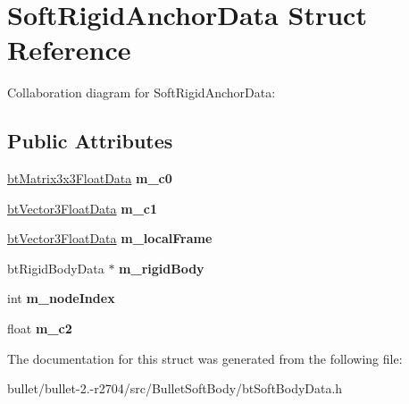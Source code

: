 \hypertarget{struct_soft_rigid_anchor_data}{\section{Soft\+Rigid\+Anchor\+Data Struct Reference}
\label{struct_soft_rigid_anchor_data}
}


Collaboration diagram for Soft\+Rigid\+Anchor\+Data\+:
\subsection*{Public Attributes}
\begin{DoxyCompactItemize}
\item 
\hypertarget{struct_soft_rigid_anchor_data_a0a22d1db38d705aeed26b269ea626fd4}{\hyperlink{structbt_matrix3x3_float_data}{bt\+Matrix3x3\+Float\+Data} {\bfseries m\+\_\+c0}}\label{struct_soft_rigid_anchor_data_a0a22d1db38d705aeed26b269ea626fd4}

\item 
\hypertarget{struct_soft_rigid_anchor_data_a83c966bd2a61bb9b6324bc66ba6425aa}{\hyperlink{structbt_vector3_float_data}{bt\+Vector3\+Float\+Data} {\bfseries m\+\_\+c1}}\label{struct_soft_rigid_anchor_data_a83c966bd2a61bb9b6324bc66ba6425aa}

\item 
\hypertarget{struct_soft_rigid_anchor_data_a1c9b5b7de7eae0bcefcc06241ea10b04}{\hyperlink{structbt_vector3_float_data}{bt\+Vector3\+Float\+Data} {\bfseries m\+\_\+local\+Frame}}\label{struct_soft_rigid_anchor_data_a1c9b5b7de7eae0bcefcc06241ea10b04}

\item 
\hypertarget{struct_soft_rigid_anchor_data_a893c8e4bd76a06d9312439d615ca9676}{bt\+Rigid\+Body\+Data $\ast$ {\bfseries m\+\_\+rigid\+Body}}\label{struct_soft_rigid_anchor_data_a893c8e4bd76a06d9312439d615ca9676}

\item 
\hypertarget{struct_soft_rigid_anchor_data_aff037297a50a284782d25b7b9e07128e}{int {\bfseries m\+\_\+node\+Index}}\label{struct_soft_rigid_anchor_data_aff037297a50a284782d25b7b9e07128e}

\item 
\hypertarget{struct_soft_rigid_anchor_data_ac04b4388734aef9e6aca362fc6a686e2}{float {\bfseries m\+\_\+c2}}\label{struct_soft_rigid_anchor_data_ac04b4388734aef9e6aca362fc6a686e2}

\end{DoxyCompactItemize}


The documentation for this struct was generated from the following file\+:\begin{DoxyCompactItemize}
\item 
bullet/bullet-\/2.-\/r2704/src/\+Bullet\+Soft\+Body/bt\+Soft\+Body\+Data.\+h\end{DoxyCompactItemize}
